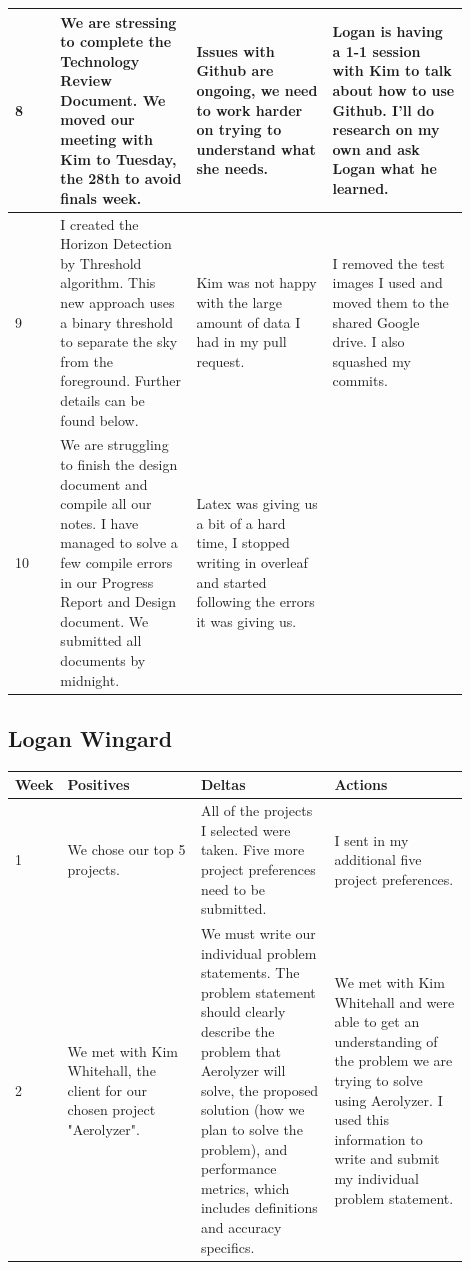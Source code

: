 \documentclass[onecolumn, draftclsnofoot,10pt, compsoc]{IEEEtran}
\begin{document}
\begin{singlespace}
\begin{longtable}{|l|p{0.3\linewidth}|p{0.3\linewidth}|p{0.3\linewidth}|}
		8	&
			We are stressing to complete the Technology Review Document.
			We moved our meeting with Kim to Tuesday, the 28th to avoid finals week.
			&
			Issues with Github are ongoing, we need to work harder on trying to understand what she needs.
			&
			Logan is having a 1-1 session with Kim to talk about how to use Github. I'll do research on my own and ask Logan what he learned.
			\\\hline

		9	&
			I created the Horizon Detection by Threshold algorithm.
			This new approach uses a binary threshold to separate the sky from the foreground.
			Further details can be found below.
			&
			Kim was not happy with the large amount of data I had in my pull request.
			&
			I removed the test images I used and moved them to the shared Google drive.
			I also squashed my commits.
			\\\hline

		10	&
			We are struggling to finish the design document and compile all our notes.
			I have managed to solve a few compile errors in our Progress Report and Design document.
			We submitted all documents by midnight.
			&
			Latex was giving us a bit of a hard time, I stopped writing in overleaf and started following the errors it was giving us.

			\\\hline
		\end{longtable}
		\subsection{Logan Wingard}
		\begin{longtable}{|l|p{0.3\linewidth}|p{0.3\linewidth}|p{0.3\linewidth}|}\hline \textbf{Week} & \textbf{Positives} & \textbf{Deltas} & \textbf{Actions}\\\hline
		1 	& We chose our top 5 projects. & All of the projects I selected were taken. Five more project preferences need to be submitted. & I sent in my additional five project preferences. \\\hline

		2 	& We met with Kim Whitehall, the client for our chosen project "Aerolyzer". & We must write our individual problem statements. The problem statement should clearly describe the problem that Aerolyzer will solve, the proposed solution (how we plan to solve the problem), and performance metrics, which includes definitions and accuracy specifics.  & We met with Kim Whitehall and were able to get an understanding of the problem we are trying to solve using Aerolyzer. I used this information to write and submit my individual problem statement. \\\hline


\end{longtable}
\end{singlespace}
\end{document}
